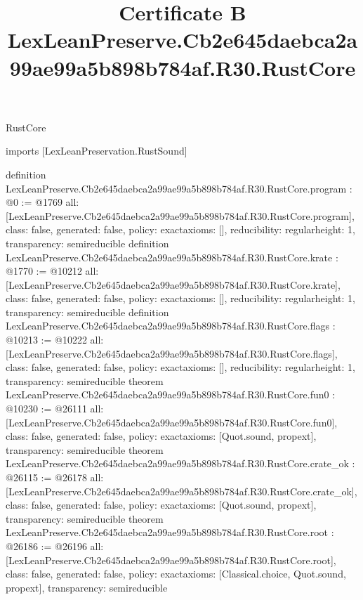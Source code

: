 \begin{lexlean}{RustCore}
\title{Certificate B LexLeanPreserve.Cb2e645daebca2a99ae99a5b898b784af.R30.RustCore}
\begin{coremodule}
imports [LexLeanPreservation.RustSound]

definition LexLeanPreserve.Cb2e645daebca2a99ae99a5b898b784af.R30.RustCore.program : @0 := @1769 {
  all: [LexLeanPreserve.Cb2e645daebca2a99ae99a5b898b784af.R30.RustCore.program],
  class: false,
  generated: false,
  policy: exact{axioms: []},
  reducibility: regular{height: 1},
  transparency: semireducible
}
definition LexLeanPreserve.Cb2e645daebca2a99ae99a5b898b784af.R30.RustCore.krate : @1770 := @10212 {
  all: [LexLeanPreserve.Cb2e645daebca2a99ae99a5b898b784af.R30.RustCore.krate],
  class: false,
  generated: false,
  policy: exact{axioms: []},
  reducibility: regular{height: 1},
  transparency: semireducible
}
definition LexLeanPreserve.Cb2e645daebca2a99ae99a5b898b784af.R30.RustCore.flags : @10213 := @10222 {
  all: [LexLeanPreserve.Cb2e645daebca2a99ae99a5b898b784af.R30.RustCore.flags],
  class: false,
  generated: false,
  policy: exact{axioms: []},
  reducibility: regular{height: 1},
  transparency: semireducible
}
theorem LexLeanPreserve.Cb2e645daebca2a99ae99a5b898b784af.R30.RustCore.fun0 : @10230 := @26111 {
  all: [LexLeanPreserve.Cb2e645daebca2a99ae99a5b898b784af.R30.RustCore.fun0],
  class: false,
  generated: false,
  policy: exact{axioms: [Quot.sound, propext]},
  transparency: semireducible
}
theorem LexLeanPreserve.Cb2e645daebca2a99ae99a5b898b784af.R30.RustCore.crate_ok : @26115 := @26178 {
  all: [LexLeanPreserve.Cb2e645daebca2a99ae99a5b898b784af.R30.RustCore.crate_ok],
  class: false,
  generated: false,
  policy: exact{axioms: [Quot.sound, propext]},
  transparency: semireducible
}
theorem LexLeanPreserve.Cb2e645daebca2a99ae99a5b898b784af.R30.RustCore.root : @26186 := @26196 {
  all: [LexLeanPreserve.Cb2e645daebca2a99ae99a5b898b784af.R30.RustCore.root],
  class: false,
  generated: false,
  policy: exact{axioms: [Classical.choice, Quot.sound, propext]},
  transparency: semireducible
}


\end{coremodule}
\end{lexlean}
